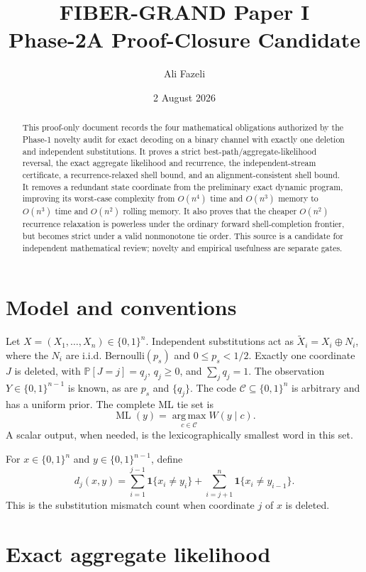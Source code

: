 \documentclass[11pt]{article}
\title{FIBER-GRAND Paper I\\Phase-2A Proof-Closure Candidate}
\author{Ali Fazeli}
\date{2 August 2026}
\theoremstyle{remark}
\newcommand{\C}{\mathcal C}
\newcommand{\ind}{\mathbf 1}
\newcommand{\Prb}{\mathbb P}
\newcommand{\argmax}{\operatorname*{arg\,max}}
\begin{document}
\maketitle

\begin{abstract}
This proof-only document records the four mathematical obligations authorized by the
Phase-1 novelty audit for exact decoding on a binary channel with exactly one deletion
and independent substitutions. It proves a strict best-path/aggregate-likelihood
reversal, the exact aggregate likelihood and recurrence, the independent-stream
certificate, a recurrence-relaxed shell bound, and an alignment-consistent shell bound.
It removes a redundant state coordinate from the preliminary exact dynamic program,
improving its worst-case complexity from $O(n^4)$ time and $O(n^3)$ memory to $O(n^3)$
time and $O(n^2)$ rolling memory. It also proves that the cheaper $O(n^2)$ recurrence
relaxation is powerless under the ordinary forward shell-completion frontier, but becomes
strict under a valid nonmonotone tie order. This source is a candidate for independent
mathematical review; novelty and empirical usefulness are separate gates.
\end{abstract}

\section{Model and conventions}

Let $X=(X_1,\ldots,X_n)\in\{0,1\}^n$. Independent substitutions act as
$\widetilde X_i=X_i\oplus N_i$, where the $N_i$ are i.i.d. Bernoulli$(p_s)$ and
$0\le p_s<1/2$. Exactly one coordinate $J$ is deleted, with
$\Prb[J=j]=q_j$, $q_j\ge0$, and $\sum_jq_j=1$. The observation
$Y\in\{0,1\}^{n-1}$ is known, as are $p_s$ and $\{q_j\}$. The code
$\C\subseteq\{0,1\}^n$ is arbitrary and has a uniform prior. The complete ML tie set is
\[
 \operatorname{ML}(y)=\argmax_{c\in\C}W(y\mid c).
\]
A scalar output, when needed, is the lexicographically smallest word in this set.

For $x\in\{0,1\}^n$ and $y\in\{0,1\}^{n-1}$, define
\begin{equation}
 d_j(x,y)=\sum_{i=1}^{j-1}\ind\{x_i\ne y_i\}
 +\sum_{i=j+1}^{n}\ind\{x_i\ne y_{i-1}\}.
 \label{eq:dj}
\end{equation}
This is the substitution mismatch count when coordinate $j$ of $x$ is deleted.

\section{Exact aggregate likelihood}
\end{document}
